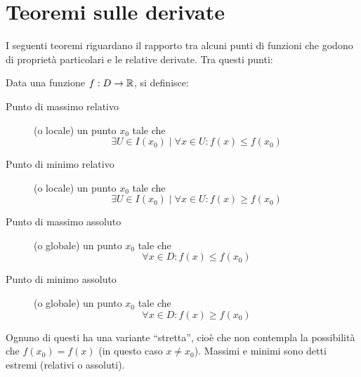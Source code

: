 %
%
%
%


\section{Teoremi sulle derivate}
I seguenti teoremi riguardano il rapporto tra alcuni punti di funzioni che godono di proprietà particolari e le relative derivate. Tra questi punti:
\begin{defin}
	Data una funzione $f:D\to\mathbb{R}$, si definisce:
	\begin{description}
		\item[Punto di massimo relativo] (o locale) un punto $x_0$ tale che
			\[
				\exists U\in I(x_0)\mid\forall x\in U: f(x)\leq f(x_0)
			\]
		\item[Punto di minimo relativo] (o locale) un punto $x_0$ tale che
			\[
				\exists U\in I(x_0)\mid\forall x\in U: f(x)\geq f(x_0)
			\]
		\item[Punto di massimo assoluto] (o globale) un punto $x_0$ tale che
			\[
				\forall x\in D: f(x)\leq f(x_0)
			\]
		\item[Punto di minimo assoluto] (o globale) un punto $x_0$ tale che
			\[
				\forall x\in D: f(x)\geq f(x_0)
			\]
	\end{description}
	Ognuno di questi ha una variante ``stretta'', cioè che non contempla la possibilità che $f(x_0)=f(x)$ (in questo caso $x\neq x_0$). Massimi e minimi sono detti estremi (relativi o assoluti).
\end{defin}


